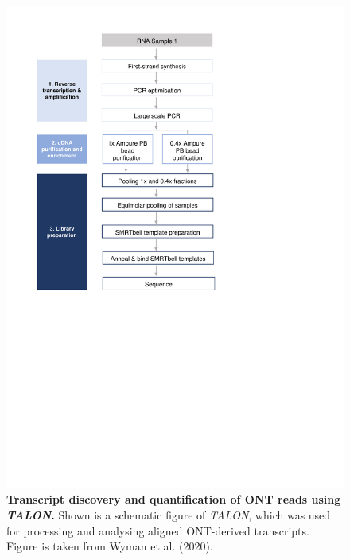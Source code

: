 \begin{figure}[htp]
	\centering
	\includegraphics[page=23,trim={0cm 11cm 0cm 2cm},clip,scale = 0.7]{Figures/ProjectDevelopment_Figures}
	\captionsetup{width=0.95\textwidth,singlelinecheck=off}
	\caption[Transcript discovery and quantification of ONT reads using \textit{TALON}]%
	{\textbf{Transcript discovery and quantification of ONT reads using \textit{TALON}.} Shown is a schematic figure of \textit{TALON}, which was used for processing and analysing aligned ONT-derived transcripts. Figure is taken from Wyman et al. (2020)\cite{Wyman2019}.  
	}
	\label{fig:ONT_Talon}
\end{figure}